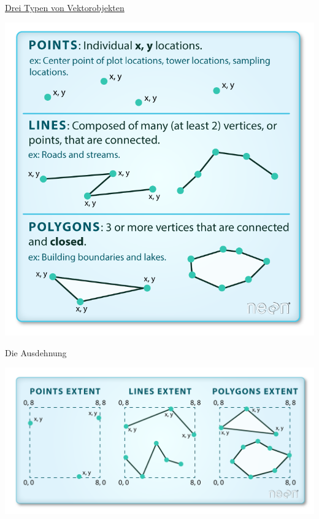\documentclass[ignorenonframetext,]{beamer}
\begin{document}
\begin{frame}{\href{https://www.earthdatascience.org/courses/earth-analytics/spatial-data-r/intro-vector-data-r/}{Drei
Typen von Vektorobjekten}}

\includegraphics{figure/points-lines-polygons-vector-data-types.png}

\end{frame}

\begin{frame}{Die Ausdehnung}

\includegraphics{figure/spatial-extent.png}

\end{frame}
\end{document}
